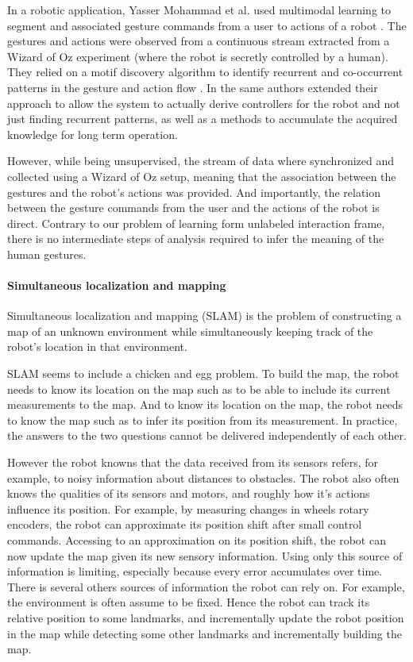 In a robotic application, Yasser Mohammad et al. used multimodal learning to segment and associated gesture commands from a user to actions of a robot \cite{mohammad2009unsupervised}. The gestures and actions were observed from a continuous stream extracted from a Wizard of Oz experiment (where the robot is secretly controlled by a human). They relied on a motif discovery algorithm to identify recurrent and co-occurrent patterns in the gesture and action flow \cite{mohammad2009constrained}. In \cite{mohammad2010learning} the same authors extended their approach to allow the system to actually derive controllers for the robot and not just finding recurrent patterns, as well as a methods to accumulate the acquired knowledge for long term operation.

However, while being unsupervised, the stream of data where synchronized and collected using a Wizard of Oz setup, meaning that the association between the gestures and the robot's actions was provided. And importantly, the relation between the gesture commands from the user and the actions of the robot is direct. Contrary to our problem of learning form unlabeled interaction frame, there is no intermediate steps of analysis required to infer the meaning of the human gestures.

\paragraph{Simultaneous localization and mapping}

Simultaneous localization and mapping (SLAM) \cite{smith1990estimating,dissanayake2001solution} is  the problem of constructing a map of an unknown environment while simultaneously keeping track of the robot's location in that environment. 

SLAM seems to include a chicken and egg problem. To build the map, the robot needs to know its location on the map such as to be able to include its current measurements to the map. And to know its location on the map, the robot needs to know the map such as to infer its position from its measurement. In practice, the answers to the two questions cannot be delivered independently of each other.

However the robot knowns that the data received from its sensors refers, for example, to noisy information about distances to obstacles. The robot also often knows the qualities of its sensors and motors, and roughly how it's actions influence its position. For example, by measuring changes in wheels rotary encoders, the robot can approximate its position shift after small control commands. Accessing to an approximation on its position shift, the robot can now update the map given its new sensory information. Using only this source of information is limiting, especially because every error accumulates over time. There is several others sources of information the robot can rely on. For example, the environment is often assume to be fixed. Hence the robot can track its relative position to some landmarks, and incrementally update the robot position in the map while detecting some other landmarks and incrementally building the map.

